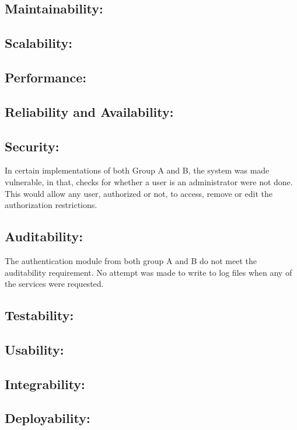 \subsection{Maintainability:}

\subsection{Scalability:}

\subsection{Performance:}

\subsection{Reliability and Availability:}

\subsection{Security:}
In certain implementations of both  Group A and B, the system was made vulnerable, in that, checks for whether a user is an administrator were not done. This would allow any user, authorized or not, to access, remove or edit the authorization restrictions.

\subsection{Auditability:}
The authentication module from both group A and B do not meet the auditability requirement. No attempt was made to write to log files when any of the services were requested.

\subsection{Testability:}

\subsection{Usability:}

\subsection{Integrability:}

\subsection{Deployability:}